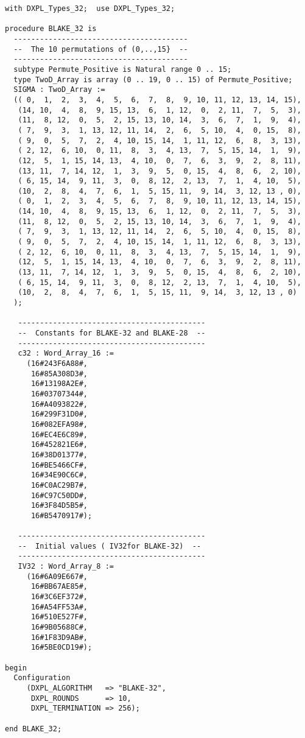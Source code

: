 \documentclass{acmtrans2m}
\begin{document}
\begin{lstlisting}[caption={Integrating permutation, constants and initial values to Ada},label=listing:ada1]
with DXPL_Types_32;  use DXPL_Types_32;

procedure BLAKE_32 is
  ----------------------------------------
  --  The 10 permutations of (0,..,15}  --
  ----------------------------------------
  subtype Permute_Positive is Natural range 0 .. 15;
  type TwoD_Array is array (0 .. 19, 0 .. 15) of Permute_Positive;
  SIGMA : TwoD_Array :=
  (( 0,  1,  2,  3,  4,  5,  6,  7,  8,  9, 10, 11, 12, 13, 14, 15),
   (14, 10,  4,  8,  9, 15, 13,  6,  1, 12,  0,  2, 11,  7,  5,  3),
   (11,  8, 12,  0,  5,  2, 15, 13, 10, 14,  3,  6,  7,  1,  9,  4),
   ( 7,  9,  3,  1, 13, 12, 11, 14,  2,  6,  5, 10,  4,  0, 15,  8),
   ( 9,  0,  5,  7,  2,  4, 10, 15, 14,  1, 11, 12,  6,  8,  3, 13),
   ( 2, 12,  6, 10,  0, 11,  8,  3,  4, 13,  7,  5, 15, 14,  1,  9),
   (12,  5,  1, 15, 14, 13,  4, 10,  0,  7,  6,  3,  9,  2,  8, 11),
   (13, 11,  7, 14, 12,  1,  3,  9,  5,  0, 15,  4,  8,  6,  2, 10),
   ( 6, 15, 14,  9, 11,  3,  0,  8, 12,  2, 13,  7,  1,  4, 10,  5),
   (10,  2,  8,  4,  7,  6,  1,  5, 15, 11,  9, 14,  3, 12, 13 , 0), 
   ( 0,  1,  2,  3,  4,  5,  6,  7,  8,  9, 10, 11, 12, 13, 14, 15),
   (14, 10,  4,  8,  9, 15, 13,  6,  1, 12,  0,  2, 11,  7,  5,  3),
   (11,  8, 12,  0,  5,  2, 15, 13, 10, 14,  3,  6,  7,  1,  9,  4),
   ( 7,  9,  3,  1, 13, 12, 11, 14,  2,  6,  5, 10,  4,  0, 15,  8),
   ( 9,  0,  5,  7,  2,  4, 10, 15, 14,  1, 11, 12,  6,  8,  3, 13),
   ( 2, 12,  6, 10,  0, 11,  8,  3,  4, 13,  7,  5, 15, 14,  1,  9),
   (12,  5,  1, 15, 14, 13,  4, 10,  0,  7,  6,  3,  9,  2,  8, 11),
   (13, 11,  7, 14, 12,  1,  3,  9,  5,  0, 15,  4,  8,  6,  2, 10),
   ( 6, 15, 14,  9, 11,  3,  0,  8, 12,  2, 13,  7,  1,  4, 10,  5),
   (10,  2,  8,  4,  7,  6,  1,  5, 15, 11,  9, 14,  3, 12, 13 , 0)
  );

   -------------------------------------------
   --  Constants for BLAKE-32 and BLAKE-28  --
   -------------------------------------------
   c32 : Word_Array_16 :=
     (16#243F6A88#,
      16#85A308D3#,
      16#13198A2E#,
      16#03707344#,
      16#A4093822#,
      16#299F31D0#,
      16#082EFA98#,
      16#EC4E6C89#,
      16#452821E6#,
      16#38D01377#,
      16#BE5466CF#,
      16#34E90C6C#,
      16#C0AC29B7#,
      16#C97C50DD#,
      16#3F84D5B5#,
      16#B5470917#); 

   -------------------------------------------
   --  Initial values ( IV32for BLAKE-32)  --
   -------------------------------------------
   IV32 : Word_Array_8 :=
     (16#6A09E667#,
      16#BB67AE85#,
      16#3C6EF372#,
      16#A54FF53A#,
      16#510E527F#,
      16#9B05688C#,
      16#1F83D9AB#,
      16#5BE0CD19#);
     
begin
  Configuration
     (DXPL_ALGORITHM   => "BLAKE-32",
      DXPL_ROUNDS      => 10,
      DXPL_TERMINATION => 256);

end BLAKE_32;
\end{lstlisting}
\end{document}
